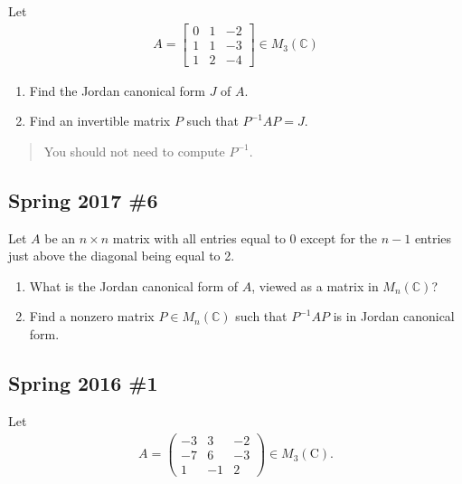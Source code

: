 Let
\begin{align*}
A=\left[\begin{array}{lll}{0} & {1} & {-2} \\ {1} & {1} & {-3} \\ {1} & {2} & {-4}\end{array}\right] \in M_{3}(\mathbb{C})
\end{align*}

\begin{enumerate}
\def\labelenumi{\alph{enumi}.}
\item
  Find the Jordan canonical form \(J\) of \(A\).
\item
  Find an invertible matrix \(P\) such that \(P^{-1}AP = J\).
\end{enumerate}

\begin{quote}
You should not need to compute \(P^{-1}\).
\end{quote}

\hypertarget{spring-2017-6}{%
\subsection{Spring 2017 \#6}\label{spring-2017-6}}

Let \(A\) be an \(n\times n\) matrix with all entries equal to \(0\)
except for the \(n-1\) entries just above the diagonal being equal to 2.

\begin{enumerate}
\def\labelenumi{\alph{enumi}.}
\item
  What is the Jordan canonical form of \(A\), viewed as a matrix in
  \(M_n({\mathbb{C}})\)?
\item
  Find a nonzero matrix \(P\in M_n({\mathbb{C}})\) such that
  \(P^{-1}A P\) is in Jordan canonical form.
\end{enumerate}

\hypertarget{spring-2016-1}{%
\subsection{Spring 2016 \#1}\label{spring-2016-1}}

Let
\begin{align*}
A=\left(\begin{array}{ccc}
-3 & 3 & -2 \\
-7 & 6 & -3 \\
1 & -1 & 2
\end{array}\right) \in M_{3}(\mathrm{C})
.\end{align*}

